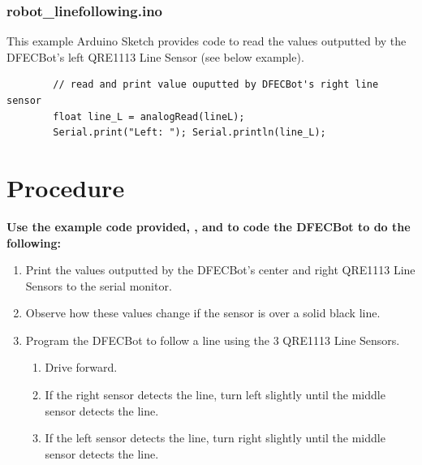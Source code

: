 \documentclass{handout}
\begin{document}
	\subsubsection{robot\_linefollowing.ino}
	This example Arduino Sketch provides code to read the values outputted by the DFECBot's left QRE1113 Line Sensor (see below example).
	
	\begin{lstlisting}
		// read and print value ouputted by DFECBot's right line sensor
		float line_L = analogRead(lineL);
		Serial.print("Left: "); Serial.println(line_L);
	\end{lstlisting}
	
	\newpage
	\clearpage
	\pagebreak
	
	\section{Procedure}
	\textbf{Use the example code provided, , and  to code the DFECBot to do the following:}
		
	\begin{enumerate}
		\item Print the values outputted by the DFECBot's center and right QRE1113 Line Sensors to the serial monitor.
		\item Observe how these values change if the sensor is over a solid black line.
		\item Program the DFECBot to follow a line using the 3 QRE1113 Line Sensors.
			\begin{enumerate}
				\item Drive forward.
				\item If the right sensor detects the line, turn left slightly until the middle sensor detects the line.
				\item If the left sensor detects the line, turn right slightly until the middle sensor detects the line.
			\end{enumerate}
	\end{enumerate} 	
\end{document}

